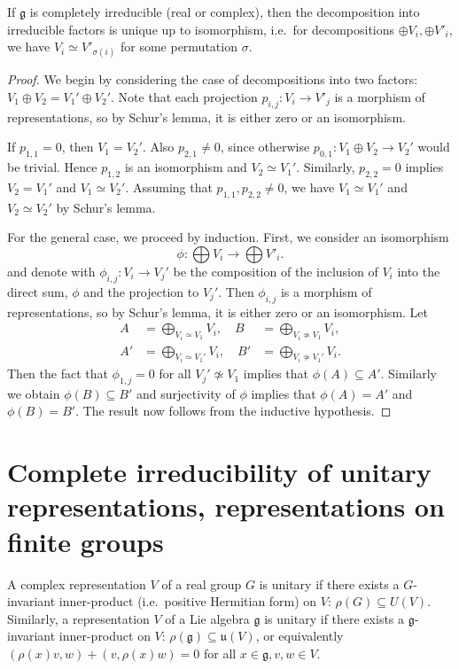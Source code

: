 \documentclass{report}
\begin{document}
\begin{proposition}
    If $\mathfrak g$ is completely irreducible (real or complex), then the decomposition into irreducible factors is unique up to isomorphism, i.e.\ for decompositions $\oplus V_i, \oplus V'_i$, we have $V_i \simeq V'_{\sigma(i)}$ for some permutation $\sigma$.
\end{proposition}
\begin{proof}
    We begin by considering the case of decompositions into two factors: $V_1 \oplus V_2 = V_1' \oplus V_2'$.
    Note that each projection $p_{i,j}: V_i \to V'_j$ is a morphism of representations, so by Schur's lemma, it is either zero or an isomorphism.
    
    If $p_{1,1} = 0$, then $V_1 = V_2'$. Also $p_{2,1} \neq 0$, since otherwise $p_{0,1}: V_1 \oplus V_2 \to V_2'$ would be trivial.
    Hence $p_{1,2}$ is an isomorphism and $V_2 \simeq V_1'$.
    Similarly, $p_{2,2} = 0$ implies $V_2 = V_1'$ and $V_1 \simeq V_2'$.
    Assuming that $p_{1,1}, p_{2,2} \neq 0$, we have $V_1 \simeq V_1'$ and $V_2 \simeq V_2'$ by Schur's lemma.

    For the general case, we proceed by induction.
    First, we consider an isomorphism
    \[
    \phi: \bigoplus V_i \to \bigoplus V'_i.
    \]
    and denote with $\phi_{i,j}:V_i \to V_j'$ be the composition of the inclusion of $V_i$ into the direct sum, $\phi$ and the projection to $V_j'$.
    Then $\phi_{i,j}$ is a morphism of representations, so by Schur's lemma, it is either zero or an isomorphism.
    Let
    \begin{align*}
        A &= \bigoplus_{V_i \simeq V_1} V_i,\quad B &= \bigoplus_{V_i \not \simeq V_1} V_i,\\
        A' &= \bigoplus_{V_i \simeq V_1'} V_i,\quad B' &= \bigoplus_{V_i \not \simeq V_1'} V_i.
    \end{align*}
    Then the fact that $\phi_{1,j} = 0$ for all $V_j' \not \simeq V_1$ implies that $\phi(A) \subseteq A'$.
    Similarly we obtain $\phi(B) \subseteq B'$ and surjectivity of $\phi$ implies that $\phi(A) = A'$ and $\phi(B) = B'$.
    The result now follows from the inductive hypothesis.
\end{proof}

\section{Complete irreducibility of unitary representations, representations on finite groups}

\begin{definition}
    A complex representation $V$ of a real group $G$ is unitary if there exists a $G$-invariant inner-product (i.e.\ positive Hermitian form) on $V$: $\rho(G) \subseteq U(V)$.
    Similarly, a representation $V$ of a Lie algebra $\mathfrak g$ is unitary if there exists a $\mathfrak g$-invariant inner-product on $V$: $\rho(\mathfrak g) \subseteq \mathfrak u(V)$, or equivalently $(\rho(x)v, w) + (v, \rho(x)w) = 0$ for all $x \in \mathfrak g, v, w \in V$.
\end{definition}
\end{document}
